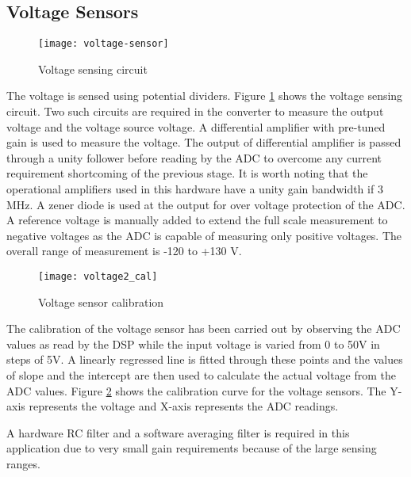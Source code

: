 \subsection{Voltage Sensors}
    \begin{figure}[h]
        \centering
        \texttt{[image: voltage-sensor]}
        \caption{Voltage sensing circuit}
        \label{fig:vsens}
    \end{figure}
	The voltage is sensed using potential dividers. Figure \ref{fig:vsens} shows the voltage sensing circuit. Two such circuits are required in the converter to measure the output voltage and the voltage source voltage. A differential amplifier with pre-tuned gain is used to measure the voltage. The output of differential amplifier is passed through a unity follower before reading by the ADC to overcome any current requirement shortcoming of the previous stage. It is worth noting that the operational amplifiers used in this hardware have a unity gain bandwidth if 3 MHz. A zener diode is used at the output for over voltage protection of the ADC. A reference voltage is manually added to extend the full scale measurement to negative voltages as the ADC is capable of measuring only positive voltages. The overall range of measurement is -120 to +130 V.
	\begin{figure}[h]
        \centering
        \texttt{[image: voltage2\_cal]}
        \caption{Voltage sensor calibration}
        \label{fig:voltage2-cal}
    \end{figure}
	The calibration of the voltage sensor has been carried out by observing the ADC values as read by the DSP while the input voltage is varied from 0 to 50V in steps of 5V. A linearly regressed line is fitted through these points and the values of slope and the intercept are then used to calculate the actual voltage from the ADC values. Figure \ref{fig:voltage2-cal} shows the calibration curve for the voltage sensors. The Y-axis represents the voltage and X-axis represents the ADC readings.
	
	A hardware RC filter and a software averaging filter is required in this application due to very small gain requirements because of the large sensing ranges.
	

